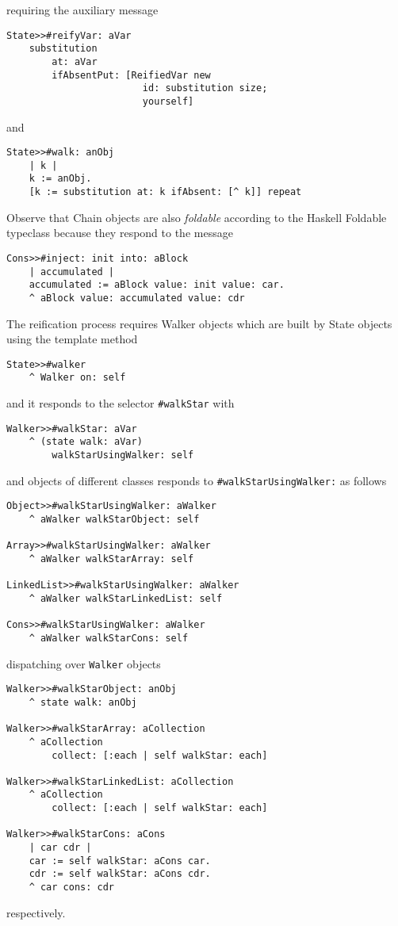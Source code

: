\documentclass[a4paper,11pt]{article}
\newcommand{\ct}[1]{{\textsf{#1}}\xspace}
\begin{document}
requiring the auxiliary message
\begin{verbatim}
State>>#reifyVar: aVar 
    substitution
        at: aVar
        ifAbsentPut: [ReifiedVar new 
                        id: substitution size; 
                        yourself]
\end{verbatim}
and
\begin{verbatim}
State>>#walk: anObj 
    | k |
    k := anObj.
    [k := substitution at: k ifAbsent: [^ k]] repeat
\end{verbatim}
Observe that \ct{Chain} objects are also \textit{foldable} according to the
Haskell \ct{Foldable} typeclass because they respond to the message
\begin{verbatim}
Cons>>#inject: init into: aBlock 
    | accumulated |
    accumulated := aBlock value: init value: car.
    ^ aBlock value: accumulated value: cdr
\end{verbatim}

The reification process requires \ct{Walker} objects which are built by
\ct{State} objects using the template method
\begin{verbatim}
State>>#walker
    ^ Walker on: self
\end{verbatim}
and it responds to the selector \Verb|#walkStar| with
\begin{verbatim}
Walker>>#walkStar: aVar
    ^ (state walk: aVar)
        walkStarUsingWalker: self
\end{verbatim}
and objects of different classes responds to \Verb|#walkStarUsingWalker:| as follows
\begin{verbatim}
Object>>#walkStarUsingWalker: aWalker
    ^ aWalker walkStarObject: self

Array>>#walkStarUsingWalker: aWalker
    ^ aWalker walkStarArray: self

LinkedList>>#walkStarUsingWalker: aWalker
    ^ aWalker walkStarLinkedList: self

Cons>>#walkStarUsingWalker: aWalker
    ^ aWalker walkStarCons: self
\end{verbatim}
dispatching over \Verb|Walker| objects
\begin{verbatim}
Walker>>#walkStarObject: anObj
    ^ state walk: anObj

Walker>>#walkStarArray: aCollection
    ^ aCollection
        collect: [:each | self walkStar: each]

Walker>>#walkStarLinkedList: aCollection
    ^ aCollection
        collect: [:each | self walkStar: each]

Walker>>#walkStarCons: aCons
    | car cdr |
    car := self walkStar: aCons car.
    cdr := self walkStar: aCons cdr.
    ^ car cons: cdr
\end{verbatim}
respectively.
\end{document}
